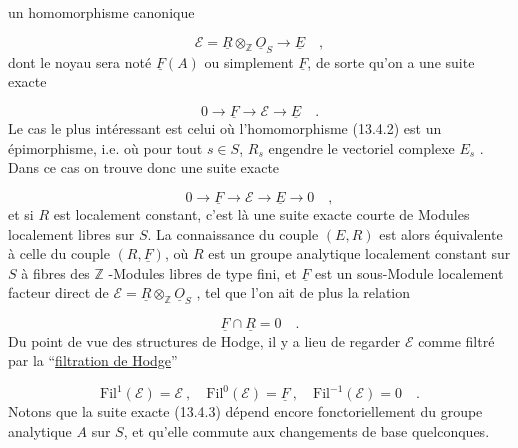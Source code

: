 
un homomorphisme canonique

\begin{equation}\tag{13.4.2}
\mathcal{E} = \underline{R} \otimes_{\mathbb{Z}} \underline{O}_S \longrightarrow \underline{E} \quad ,
\end{equation}
dont le noyau sera noté $\underline{F}(A)$ ou simplement $\underline{F}$, de sorte qu'on a une suite exacte

\begin{equation}\tag{13.4.3}
0 \longrightarrow \underline{F} \longrightarrow \mathcal{E} \longrightarrow \underline{E} \quad .
\end{equation}
Le cas le plus intéressant est celui où l'homomorphisme (13.4.2) est un épimorphisme, i.e. où pour tout $s \in S$, $R_s$ engendre le vectoriel complexe $E_s$ . Dans ce cas on trouve donc une suite exacte

\begin{equation}\tag{13.4.4}
0 \longrightarrow \underline{F} \longrightarrow \mathcal{E} \longrightarrow \underline{E} \longrightarrow 0 \quad ,
\end{equation}
et si $R$ est localement constant, c'est là une suite exacte courte de Modules localement libres sur $S$. La connaissance du couple $(E,R)$ est alors équivalente à celle du couple $(R,\underline{F})$, où $R$ est un groupe analytique localement constant sur $S$ à fibres des $\mathbb{Z}$ -Modules libres de type fini, et $\underline{F}$ est un sous-Module localement facteur direct de $\mathcal{E} = \underline{R} \otimes_{\mathbb{Z}} \underline{O}_S$ , tel que l'on ait de plus la relation

\begin{equation}\tag{13.4.5}
\underline{F} \cap \underline{R} = 0 \quad .
\end{equation}
Du point de vue des structures de Hodge, il y a lieu de regarder $\mathcal{E}$ comme filtré par la ``\underline{filtration de Hodge}''

\begin{equation}\tag{13.4.6}
\mathrm{Fil}^{1}(\mathcal{E}) = \mathcal{E} \ , \quad \mathrm{Fil}^{0}(\mathcal{E}) = \underline{F} \ , \quad \mathrm{Fil}^{-1}(\mathcal{E}) = 0 \quad .
\end{equation}
Notons que la suite exacte (13.4.3) dépend encore fonctoriellement du groupe analytique $A$ sur $S$, et qu'elle commute aux changements de base quelconques.



